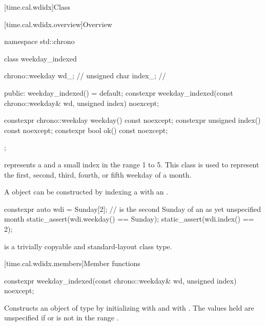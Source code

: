 [time.cal.wdidx]{Class }

[time.cal.wdidx.overview]{Overview}

\begin{codeblock}
namespace std::chrono {
  class weekday_indexed {
    chrono::weekday  wd_;       // \expos
    unsigned char    index_;    // \expos

  public:
    weekday_indexed() = default;
    constexpr weekday_indexed(const chrono::weekday& wd, unsigned index) noexcept;

    constexpr chrono::weekday weekday() const noexcept;
    constexpr unsigned        index()   const noexcept;
    constexpr bool ok() const noexcept;
  };
}
\end{codeblock}

\pnum
{} represents a 
and a small index in the range 1 to 5.
This class is used to represent the
first, second, third, fourth, or fifth weekday of a month.

\pnum
\begin{note}
A  object
can be constructed by indexing a 
with an .
\end{note}
\begin{example}
\begin{codeblock}
constexpr auto wdi = Sunday[2]; //  is the second Sunday of an as yet unspecified month
static_assert(wdi.weekday() == Sunday);
static_assert(wdi.index() == 2);
\end{codeblock}
\end{example}

\pnum
{} is a trivially copyable and standard-layout class type.

[time.cal.wdidx.members]{Member functions}

%
\begin{itemdecl}
constexpr weekday_indexed(const chrono::weekday& wd, unsigned index) noexcept;
\end{itemdecl}

\begin{itemdescr}
\pnum
\effects
Constructs an object of type  by
initializing  with  and  with .
The values held are unspecified if  or  is not in the range .
\end{itemdescr}

